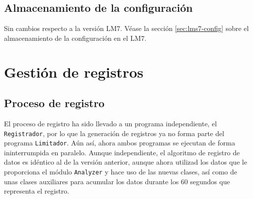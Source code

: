 \subsection{Almacenamiento de la configuración}

Sin cambios respecto a la versión \acrshort{LM7}. Véase la sección \ref{sec:lms7-config} sobre el almacenamiento de la configuración en el \acrshort{LM7}.

\section{Gestión de registros}

\subsection{Proceso de registro}

El proceso de registro ha sido llevado a un programa independiente, el \verb|Registrador|, por lo que la generación de registros ya no forma parte del programa \verb|Limitador|. Aún así, ahora ambos programas se ejecutan de forma ininterrumpida en paralelo. Aunque independiente, el algoritmo de registro de datos es idéntico al de la versión anterior, aunque ahora utilizad los datos que le proporciona el módulo \verb|Analyzer| y hace uso de las nuevas clases, así como de unas clases auxiliares para acumular los datos durante los 60 segundos que representa el registro. \\

